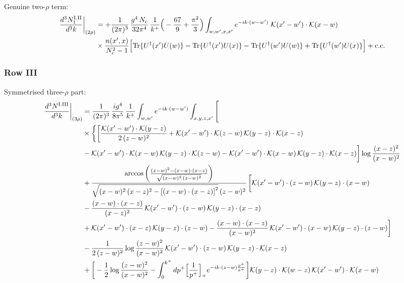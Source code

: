 \documentclass[9pt]{article}
\numberwithin{equation}{section}
\begin{document}
Genuine two-$\rho$ term:
\begin{align}
\frac{d^{3}N^{\rm I.II}_{1}}{d^{3}k}\bigg|_{(2\rho)} & = +\frac{1}{(2\pi)^{3}}\,\frac{g^{4}\,N_{c}}{32\pi^{4}}\,\frac{1}{k^{+}}\Big(-\frac{67}{9}+\frac{\pi^{2}}{3}\Big)\int_{w,w',x,x'} e^{-ik\cdot(w-w')}\;\mathcal{K}(x'-w')\cdot\mathcal{K}(x-w)\notag \\
& \times\frac{n(x',x)}{N_{c}^{2}-1}\Big[{\rm Tr}\{U^{\dagger}(x')U(w)\}-{\rm Tr}\{U^{\dagger}(x')U(x)\}-{\rm Tr}\{U^{\dagger}(w')U(w)\}+{\rm Tr}\{U^{\dagger}(w')U(x)\}\Big]+{\rm c.c.}\label{eq:E-I.II-2o}
\end{align}
\subsubsection*{Row III}
Symmetrised three-$\rho$ part:
\begin{align}
\frac{d^{3}N^{\rm I.III}}{d^{3}k}\bigg|_{(3\rho)}&=\frac{1}{(2\pi)^{3}}\,\frac{ig^{4}}{8\pi^{5}}\,\frac{1}{k^{+}}\int_{w,w'}e^{-ik\cdot(w-w')}\int_{x,y,z,x'}\Bigg[\notag\\
&\times\bigg\{\bigg[\frac{\mathcal{K}(x'-w')\cdot\mathcal{K}(y-z)}{2\,(z-w)^{2}}+\mathcal{K}(x'-w')\cdot\mathcal{K}(z-w)\,\mathcal{K}(y-z)\cdot\mathcal{K}(x-z)\notag\\
&-\mathcal{K}(x'-w')\cdot\mathcal{K}(x-w)\,\mathcal{K}(y-z)\cdot\mathcal{K}(z-w)-\mathcal{K}(x'-w')\cdot\mathcal{K}(x-w)\,\mathcal{K}(y-z)\cdot\mathcal{K}(x-z)\bigg]\log\frac{(x-z)^{2}}{(x-w)^{2}}\notag\\
&+\frac{\arccos\left(\frac{(x-w)^{2}-(x-w)\cdot (x-z)}{\sqrt{(x-w)^{2}\,(z-w)^{2}}}\right)}{\sqrt{(x-w)^{2}\,(x-z)^{2}-\left[(x-w)\cdot (x-z)\right]^{2}}\,(z-w)^{2}}\,\bigg[\mathcal{K}(x'-w')\cdot(z-w)\,\mathcal{K}(y-z)\cdot(x-w)\notag\\
&-\frac{(x-w)\cdot(x-z)}{(x-z)^{2}}\,\mathcal{K}(x'-w')\cdot(z-w)\,\mathcal{K}(y-z)\cdot(x-z)\notag\\
&+\mathcal{K}(x'-w')\cdot(x-z)\,\mathcal{K}(y-z)\cdot(z-w)-\frac{(x-w)\cdot(x-z)}{(x-w)^{2}}\,\mathcal{K}(x'-w')\cdot(x-w)\,\mathcal{K}(y-z)\cdot(z-w)\bigg]\notag\\
&-\frac{1}{2\,(z-w)^{2}}\log\frac{(z-w)^{2}}{(x-w)^{2}}\,\mathcal{K}(x'-w')\cdot(z-w)\,\mathcal{K}(y-z)\cdot\mathcal{K}(x-z)\notag\\
&+\bigg[-\frac{1}{2}\log\frac{(z-w)^{2}}{(x-w)^{2}}-\int_{0}^{k^{+}}dp^{+}\Big[\frac{1}{p^{+}}\Big]_{+}e^{-ik\cdot(z-w)\frac{p^{+}}{k^{+}}}\bigg]\mathcal{K}(y-z)\cdot\mathcal{K}(w-z)\,\mathcal{K}(x'-w')\cdot\mathcal{K}(x-w)\notag\\

\end{align}
\end{document}
